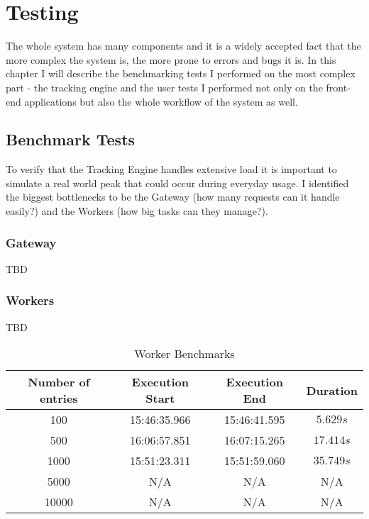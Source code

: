 \chapter{Testing}

The whole system has many components and it is a widely accepted fact that the more complex the system is, the more prone to errors and bugs it is. In this chapter I will describe the benchmarking tests I performed on the most complex part - the tracking engine and the user tests I performed not only on the front-end applications but also the whole workflow of the system as well.

\section{Benchmark Tests}

To verify that the Tracking Engine handles extensive load it is important to simulate a real world peak that could occur during everyday usage. I identified the biggest bottlenecks to be the Gateway (how many requests can it handle easily?) and the Workers (how big tasks can they manage?).

\subsection{Gateway}

TBD

\subsection{Workers}

TBD

\begin{table}[!ht]
\begin{center}
\begin{tabular}{|c|c|c|c|}
\hline
\textbf{Number of entries} & \textbf{Execution Start} & \textbf{Execution End} & \textbf{Duration} \\
\hline
100 & 15:46:35.966 & 15:46:41.595 & $5.629s$ \\
\hline
500 & 16:06:57.851 & 16:07:15.265 & $17.414s$ \\
\hline
1000 & 15:51:23.311 & 15:51:59.060 & $35.749s$ \\
\hline
5000 & N/A & N/A & N/A \\
\hline
10000 & N/A & N/A & N/A \\
\hline
\end{tabular}
\end{center}
\caption{Worker Benchmarks}
\label{tab:ex_db}
\end{table}

